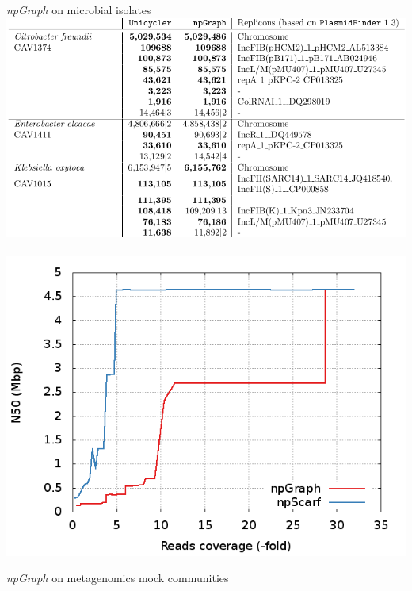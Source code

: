\documentclass{beamer}
\begin{document}
\begin{frame}{\emph{npGraph} on microbial isolates}
\centering
 \includegraphics[height=.5\textheight]{figures/npgraph_uni.png}  
~
 \includegraphics[height=.5\textheight]{figures/response.png}  
\end{frame}
\begin{frame}{\emph{npGraph} on metagenomics mock communities}
\begin{figure}[!hpb]
%
\hfill
{}%
\end{figure}
\end{frame}
\end{document}
